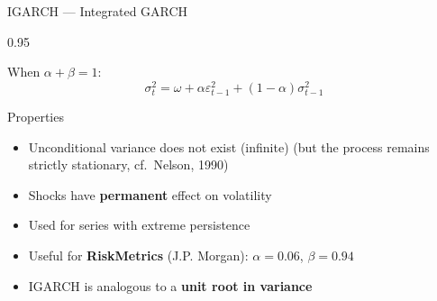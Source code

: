 \documentclass[9pt, aspectratio=169, t]{beamer}
\begin{document}
\begin{frame}{IGARCH --- Integrated GARCH}
    \begin{cminipage}{0.95\textwidth}
    \small
    \begin{defn}[IGARCH(1,1)]
        When $\alpha + \beta = 1$:
        \[
            \sigma_t^2 = \omega + \alpha \varepsilon_{t-1}^2 + (1 - \alpha) \sigma_{t-1}^2
        \]
    \end{defn}

    \vspace{0.2cm}

    \begin{block}{Properties}
        \begin{itemize}\setlength{\itemsep}{0pt}
            \item Unconditional variance does not exist (infinite) (but the process remains strictly stationary, cf.\ Nelson, 1990)
            \item Shocks have \textbf{permanent} effect on volatility
            \item Used for series with extreme persistence
            \item Useful for \textbf{RiskMetrics} (J.P. Morgan): $\alpha = 0.06$, $\beta = 0.94$
            \item IGARCH is analogous to a \textbf{unit root in variance}
        \end{itemize}
    \end{block}
    \end{cminipage}
\end{frame}
\end{document}
